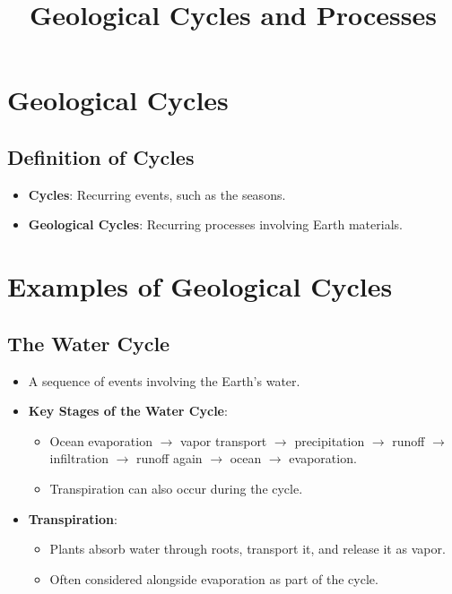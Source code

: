 \documentclass[12pt]{article}
\title{Geological Cycles and Processes}
\author{}
\date{}
\begin{document}
\maketitle

\section*{Geological Cycles}
\subsection*{Definition of Cycles}
\begin{itemize}
    \item \textbf{Cycles}: Recurring events, such as the seasons.
    \item \textbf{Geological Cycles}: Recurring processes involving Earth materials.
\end{itemize}

\section*{Examples of Geological Cycles}
\subsection*{The Water Cycle}
\begin{itemize}
    \item A sequence of events involving the Earth's water.
    \item \textbf{Key Stages of the Water Cycle}:
    \begin{itemize}
        \item Ocean evaporation $\rightarrow$ vapor transport $\rightarrow$ precipitation $\rightarrow$ runoff $\rightarrow$ infiltration $\rightarrow$ runoff again $\rightarrow$ ocean $\rightarrow$ evaporation.
        \item Transpiration can also occur during the cycle.
    \end{itemize}
    \item \textbf{Transpiration}:
    \begin{itemize}
        \item Plants absorb water through roots, transport it, and release it as vapor.
        \item Often considered alongside evaporation as part of the cycle.
    \end{itemize}
\end{itemize}
\end{document}
